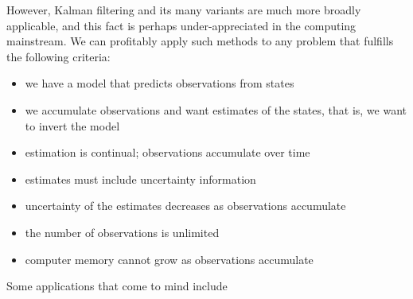 \documentclass[10pt,oneside,x11names]{article}
\begin{document}
However, Kalman filtering and its many variants are much more broadly
applicable, and this fact is perhaps under-appreciated in the computing
mainstream. We can profitably apply such methods to any problem that fulfills
the following criteria:

\begin{itemize}
\item we have a model that predicts observations from states
\item we accumulate observations and want estimates of the states, that is, we want
to invert the model
\item estimation is continual; observations accumulate over time
\item estimates must include uncertainty information
\item uncertainty of the estimates decreases as observations accumulate
\item the number of observations is unlimited
\item computer memory cannot grow as observations accumulate
\end{itemize}

\noindent Some applications that come to mind include
\end{document}
